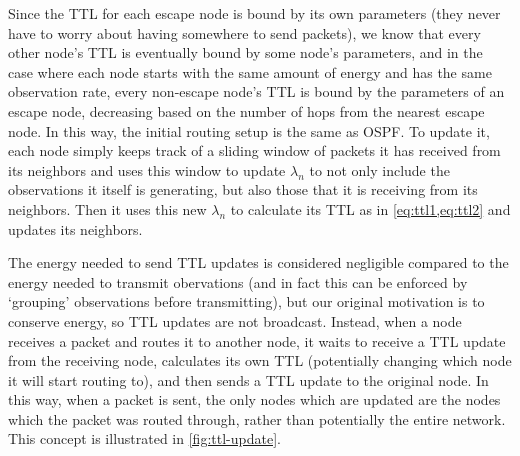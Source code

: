 \documentclass[headings=optiontoheadandtoc,listof=totoc,parskip=full]{scrartcl}
\begin{document}
Since the TTL for each escape node is bound by its own parameters (they never have to worry about having somewhere to send packets), we know that every other node's TTL is eventually bound by some node's parameters, and in the case where each node starts with the same amount of energy and has the same observation rate, every non-escape node's TTL is bound by the parameters of an escape node, decreasing based on the number of hops from the nearest escape node. In this way, the initial routing setup is the same as OSPF. To update it, each node simply keeps track of a sliding window of packets it has received from its neighbors and uses this window to update $\lambda_n$ to not only include the observations it itself is generating, but also those that it is receiving from its neighbors. Then it uses this new $\lambda_n$ to calculate its TTL as in \cref{eq:ttl1,eq:ttl2} and updates its neighbors.

The energy needed to send TTL updates is considered negligible compared to the energy needed to transmit obervations (and in fact this can be enforced by `grouping' observations before transmitting), but our original motivation is to conserve energy, so TTL updates are not broadcast. Instead, when a node receives a packet and routes it to another node, it waits to receive a TTL update from the receiving node, calculates its own TTL (potentially changing which node it will start routing to), and then sends a TTL update to the original node. In this way, when a packet is sent, the only nodes which are updated are the nodes which the packet was routed through, rather than potentially the entire network. This concept is illustrated in \cref{fig:ttl-update}.
\end{document}
